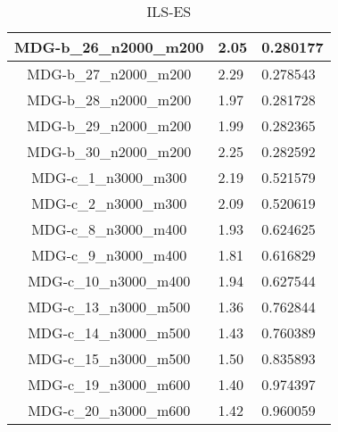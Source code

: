 \documentclass[10pt,a4paper]{article}
\begin{document}
\begin{table}[]
\begin{tabular}{|c|l|l|}
		MDG-b\_26\_n2000\_m200 & 2.05                               & 0.280177                             \\ \hline
		MDG-b\_27\_n2000\_m200 & 2.29                               & 0.278543                             \\ \hline
		MDG-b\_28\_n2000\_m200 & 1.97                               & 0.281728                             \\ \hline
		MDG-b\_29\_n2000\_m200 & 1.99                               & 0.282365                             \\ \hline
		MDG-b\_30\_n2000\_m200 & 2.25                               & 0.282592                             \\ \hline
		MDG-c\_1\_n3000\_m300  & 2.19                               & 0.521579                             \\ \hline
		MDG-c\_2\_n3000\_m300  & 2.09                               & 0.520619                             \\ \hline
		MDG-c\_8\_n3000\_m400  & 1.93                               & 0.624625                             \\ \hline
		MDG-c\_9\_n3000\_m400  & 1.81                               & 0.616829                             \\ \hline
		MDG-c\_10\_n3000\_m400 & 1.94                               & 0.627544                             \\ \hline
		MDG-c\_13\_n3000\_m500 & 1.36                               & 0.762844                             \\ \hline
		MDG-c\_14\_n3000\_m500 & 1.43                               & 0.760389                             \\ \hline
		MDG-c\_15\_n3000\_m500 & 1.50                               & 0.835893                             \\ \hline
		MDG-c\_19\_n3000\_m600 & 1.40                               & 0.974397                             \\ \hline
		MDG-c\_20\_n3000\_m600 & 1.42                               & 0.960059                             \\ \hline
	\end{tabular}
	\caption{ILS-ES}
	\label{table:ILS_ES}
\end{table}
\end{document}

